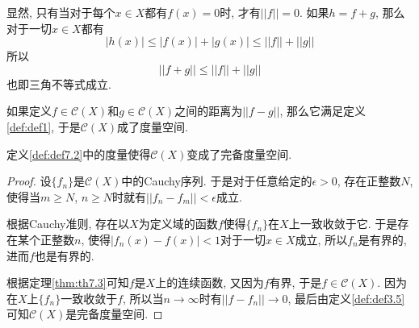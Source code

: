 \documentclass[cn,12pt,math=mtpro2,citestyle=gb7714-2015,bibstyle=gb7714-2015,twocol]{elegantbook}
\begin{document}
\begin{remark}
显然, 只有当对于每个$x\in X$都有$f(x)=0$时, 才有$||f||=0$. 如果$h=f+g$, 那么对于一切$x\in X$都有
$$|h(x)|\leq|f(x)|+|g(x)|\leq ||f||+||g||$$
所以
$$||f+g||\leq||f||+||g||$$
也即三角不等式成立.
\end{remark}

\begin{definition}\label{def:def7.2}
如果定义$f\in\mathscr{C}(X)$和$g\in\mathscr{C}(X)$之间的距离为$||f-g||$, 那么它满足定义\ref{def:def1}, 于是$\mathscr{C}(X)$成了度量空间.
\end{definition}
\begin{theorem}
  定义\ref{def:def7.2}中的度量使得$\mathscr{C}(X)$变成了完备度量空间.
\end{theorem}
\begin{proof}
  设$\{f_n\}$是$\mathscr{C}(X)$中的Cauchy序列. 于是对于任意给定的$\epsilon>0$, 存在正整数$N$, 使得当$m\geq N$, $n\geq N$时就有$||f_n-f_m||<\epsilon$成立.

  根据Cauchy准则, 存在以$X$为定义域的函数$f$使得$\{f_n\}$在$X$上一致收敛于它. 于是存在某个正整数$n$, 使得$|f_n(x)-f(x)|<1$对于一切$x\in X$成立, 所以$f_n$是有界的, 进而$f$也是有界的.

  根据定理\ref{thm:th7.3}可知$f$是$X$上的连续函数, 又因为$f$有界, 于是$f\in\mathscr{C}(X)$. 因为在$X$上$\{f_n\}$一致收敛于$f$, 所以当$n\to\infty$时有$||f-f_n||\to 0$, 最后由定义\ref{def:def3.5}可知$\mathscr{C}(X)$是完备度量空间.
\end{proof}
\newpage
\end{document}
